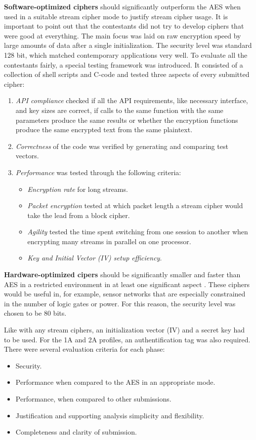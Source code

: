 \textbf{Software-optimized ciphers} should significantly outperform the AES when used in a suitable stream cipher mode to justify stream cipher usage. It is important to point out that the contestants did not try to develop ciphers that were good at everything. The main focus was laid on raw encryption speed by large amounts of data after a single initialization. The security level was standard 128 bit, which matched contemporary applications very well.
To evaluate all the contestants fairly, a special testing framework \cite{canniere2008estream} was introduced. It consisted of a collection of shell scripts and C-code and tested three aspects of every submitted cipher:
\begin{enumerate}
	\item \emph{API compliance} checked if all the API requirements, like necessary interface, and key sizes are correct, if calls to the same function with the same parameters produce the same results or whether the encryption functions produce the same encrypted text from the same plaintext. 
	\item \emph{Correctness} of the code was verified by generating and comparing test vectors.
	\item \emph{Performance} was tested through the following criteria:
	\begin{itemize}
		\item \emph{Encryption rate} for long streams.
		\item\emph{Packet encryption} tested at which packet length a stream cipher would take the lead from a block cipher.
		\item \emph{Agility} tested the time spent switching from one session to another when encrypting many streams in parallel on one processor.
		\item \emph{Key and Initial Vector (IV) setup efficiency}.
	\end{itemize}
\end{enumerate}

\textbf{Hardware-optimized cipers} should be significantly smaller and faster  than AES in a restricted environment in at least one significant aspect \cite{good2008asic}. These ciphers would be useful in, for example, sensor networks that are especially constrained in the number of logic gates or power. For this reason, the security level was chosen to be 80 bits.

Like with any stream ciphers, an initialization vector (IV) and a secret key had to be used. For the 1A and 2A profiles, an authentification tag was also required.\\
There were several evaluation criteria for each phase:
\begin{itemize}
	\setlength\itemsep{0.1em}
	\item Security.
	\item Performance when compared to the AES in an appropriate mode.
	\item Performance, when compared to other submissions.
	\item Justification and supporting analysis simplicity and flexibility.
	\item Completeness and clarity of submission.
\end{itemize}

